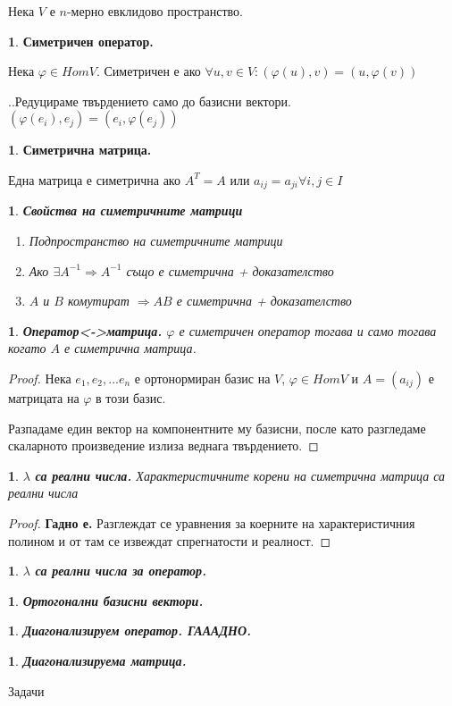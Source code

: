 \documentclass[11pt]{article}
\numberwithin{equation}{section}
\numberwithin{figure}{section}
\numberwithin{table}{section}
\theoremstyle{plain}
\theoremstyle{definition}
\newtheorem{defn}[thm]{\protect\definitionname}
\theoremstyle{remark}
\theoremstyle{definition}
\theoremstyle{remark}
\theoremstyle{plain}
\theoremstyle{definition}
\theoremstyle{definition}
\theoremstyle{plain}
\theoremstyle{plain}
\newtheorem{prop}[thm]{\protect\propositionname}
\theoremstyle{plain}
\theoremstyle{definition}
\theoremstyle{plain}
\providecommand{\definitionname}{Дефиниция}
\providecommand{\propositionname}{Твърдение}
\begin{document}
\hrulefill

Нека $V$ е $n$-мерно евклидово пространство.


\begin{defn}
\textbf{Симетричен оператор.}

Нека $\varphi \in HomV$. Симетричен е ако $\forall u,v \in V : (\varphi(u),v) = (u,\varphi(v))$
\end{defn}

..Редуцираме твърдението само до базисни вектори. $(\varphi(e_i),e_j) = (e_i,\varphi(e_j))$


\begin{defn}
\textbf{Симетрична матрица.}

Една матрица е симетрична ако $A^T = A$ или $a_{ij} = a_{ji} \forall i,j \in I$
\end{defn}

\begin{prop}
\textbf{Свойства на симетричните матрици}
\begin{enumerate}
\item Подпространство на симетричните матрици
\item Ако $\exists A^{-1} \Rightarrow A^{-1}$ също е симетрична + доказателство
\item $A$ и $B$ комутират $\Rightarrow AB$ е симетрична + доказателство
\end{enumerate}
\end{prop}


\begin{prop}
\textbf{Оператор<->матрица.}
$\varphi$ е симетричен оператор тогава и само тогава когато $A$ е симетрична матрица.
\end{prop}
\begin{proof}
Нека $e_1, e_2, ... e_n$ е ортонормиран базис на $V$, $\varphi \in HomV$ и $A = (a_{ij})$ е матрицата на $\varphi$ в този базис.

Разпадаме един вектор на компонентните му базисни, после като разгледаме скаларното произведение излиза веднага твърдението.
\end{proof}

\begin{prop}
\textbf{$\lambda$ са реални числа.}
Характеристичните корени на симетрична матрица са реални числа
\end{prop}
\begin{proof}
\textbf{Гадно е.}
Разглеждат се уравнения за коерните на характеристичния полином и от там се извеждат спрегнатости и реалност.
\end{proof}

\begin{prop}
\textbf{$\lambda$ са реални числа за оператор.}
\end{prop}

\begin{prop}
\textbf{Ортогонални базисни вектори.}
\end{prop}

\begin{prop}
\textbf{Диагонализируем оператор. ГАААДНО.}
\end{prop}

\begin{prop}
\textbf{Диагонализируема матрица.}
\end{prop}

\hrulefill

Задачи
\end{document}
